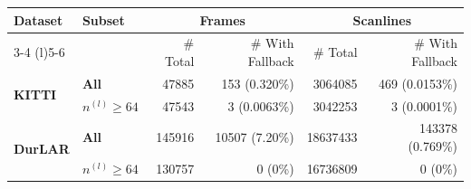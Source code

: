 \begin{tabular}{llrrrr}
\toprule
\multirow{2}{*}{\textbf{Dataset}} & \multirow{2}{*}{\textbf{Subset}} & \multicolumn{2}{c}{\textbf{Frames}} & \multicolumn{2}{c}{\textbf{Scanlines}} \\
\cmidrule(l){3-4} \cmidrule(l){5-6}
 &  & \# Total & \# With Fallback & \# Total & \# With Fallback \\
\midrule
\multirow{2}{*}{\textbf{\textbf{KITTI}}} & \textbf{All} & \num{47885} & \num{153} (0.320\%) & \num{3064085} & \num{469} (0.0153\%) \\
\textbf{} & \textbf{$n^{(l)} \geq 64$} & \num{47543} & \num{3} (0.0063\%) & \num{3042253} & \num{3} (0.0001\%) \\
\midrule
\multirow{2}{*}{\textbf{\textbf{DurLAR}}} & \textbf{All} & \num{145916} & \num{10507} (7.20\%) & \num{18637433} & \num{143378} (0.769\%) \\
\textbf{} & \textbf{$n^{(l)} \geq 64$} & \num{130757} & \num{0} (0\%) & \num{16736809} & \num{0} (0\%) \\
\bottomrule
\end{tabular}
